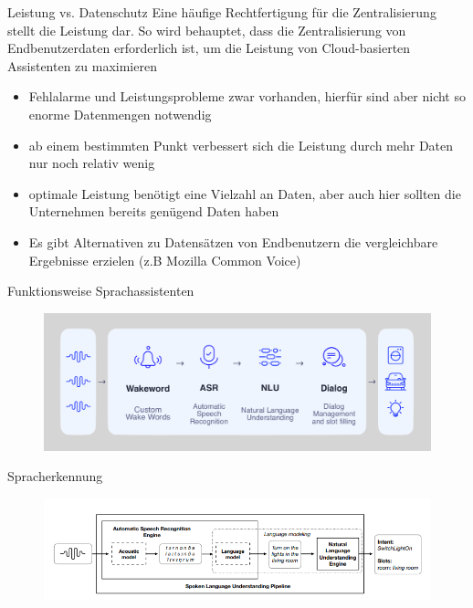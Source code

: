 \documentclass[aspectratio=169]{beamer}
\begin{document}
\begin{frame}{Leistung vs. Datenschutz}
	Eine häufige Rechtfertigung für die Zentralisierung stellt die Leistung dar. So wird behauptet, dass die Zentralisierung von Endbenutzerdaten erforderlich ist, um die Leistung von Cloud-basierten Assistenten zu maximieren
	\begin{itemize} 
		\item Fehlalarme und Leistungsprobleme zwar vorhanden, hierfür sind aber nicht so enorme Datenmengen notwendig
		\item ab einem bestimmten Punkt verbessert sich die Leistung durch mehr Daten nur noch relativ wenig
		\item optimale Leistung benötigt eine Vielzahl an Daten, aber auch hier sollten die Unternehmen bereits genügend Daten haben
		\item Es gibt Alternativen zu Datensätzen von Endbenutzern die vergleichbare Ergebnisse erzielen (z.B Mozilla Common Voice)
	\end{itemize}
\end{frame}

\begin{frame}{Funktionsweise Sprachassistenten}
	\begin{figure}
		\includegraphics[scale=0.3]{images/assistant}
	\end{figure}
\end{frame}

\begin{frame}{Spracherkennung}
	\begin{figure}
		\includegraphics[scale=0.5]{images/spoken-language-understanding}
	\end{figure}
\end{frame}
\end{document}
